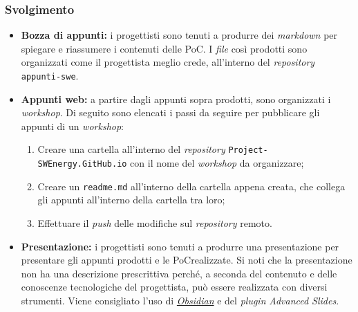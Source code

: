 \subsubsection{Svolgimento}
\begin{itemize}
	\item \textbf{Bozza di appunti:} i progettisti sono tenuti a produrre dei
	      \textit{markdown} per spiegare e riassumere i contenuti delle PoC\g. I
	      \textit{file} così prodotti sono organizzati come il progettista
	      meglio crede, all'interno del \textit{repository\g}
	      \texttt{appunti-swe}.

	\item \textbf{Appunti web:} a partire dagli appunti sopra prodotti, sono
	      organizzati i \textit{workshop}. Di seguito sono elencati i passi da
	      seguire per pubblicare gli appunti di un \textit{workshop}:
	      \begin{enumerate}
		      \item Creare una cartella all'interno del \textit{repository\g}
		            \texttt{Project-SWEnergy.GitHub\g.io} con il nome del
		            \textit{workshop} da organizzare;

		      \item Creare un \texttt{readme.md} all'interno della
		            cartella appena creata, che collega gli appunti all'interno
		            della cartella tra loro;

		      \item Effettuare il \textit{push} delle modifiche sul
		            \textit{repository\g} remoto.
	      \end{enumerate}

	\item \textbf{Presentazione:} i progettisti sono tenuti a produrre una
	      presentazione per presentare gli appunti prodotti e le PoC\g realizzate.
	      Si noti che la presentazione non ha una descrizione prescrittiva
	      perché, a seconda del contenuto e delle conoscenze tecnologiche del
	      progettista, può essere realizzata con diversi strumenti. Viene
	      consigliato l'uso di \href{https://obsidian.md/}{\textit{Obsidian}} e
	      del \textit{plugin} \textit{Advanced Slides}.
\end{itemize}
